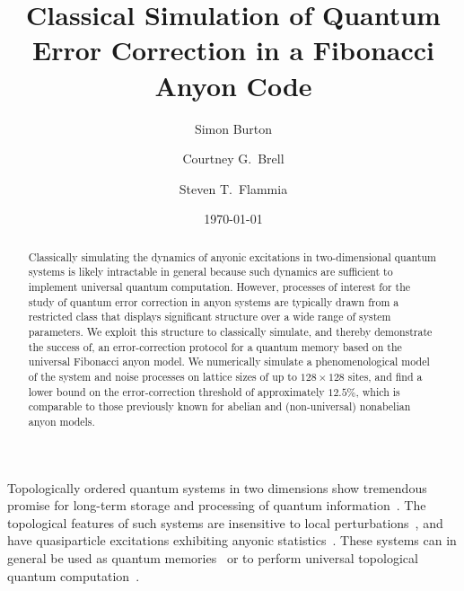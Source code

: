 \documentclass[aps, prl, letterpaper, twocolumn, superscriptaddress, notitlepage, 10pt]{revtex4-1}
\begin{document}
\title{Classical Simulation of Quantum Error Correction in a Fibonacci Anyon Code}

\author{Simon Burton}
\author{Courtney G.\ Brell}
\author{Steven T.\ Flammia}

\date{\today}

\begin{abstract}
Classically simulating the dynamics of anyonic excitations in two-dimensional quantum systems is likely intractable in general because such dynamics are sufficient to implement 
universal quantum computation. However, processes of interest for the study of quantum 
error correction in anyon systems are typically drawn from a restricted class that displays 
significant structure over a wide range of system parameters.
We exploit this structure to classically simulate, and thereby demonstrate the success of, an 
error-correction protocol for a quantum memory based on the universal Fibonacci anyon 
model.  We numerically simulate a phenomenological model of the system and noise 
processes on lattice sizes of up to 
$128\times128$ sites, and find a lower bound on the error-correction threshold of 
approximately $12.5\%$, which is comparable to those previously known for abelian and 
(non-universal) nonabelian anyon models.
\end{abstract}

\maketitle


Topologically ordered quantum systems in two dimensions show tremendous promise for 
long-term storage and processing of quantum information~\cite{Kitaev2003, Dennis2002, Nayak2008}. 
The topological features of such systems are insensitive to local 
perturbations~\cite{Bravyi2010, Bravyi2011a, Michalakis2013}, and have quasiparticle excitations 
exhibiting anyonic statistics~\cite{Wilczek1990}. These systems can in general be used as 
quantum memories~\cite{Kitaev2003, Dennis2002} or to perform universal topological 
quantum computation~\cite{Freedman2002, Nayak2008}.
\end{document}
